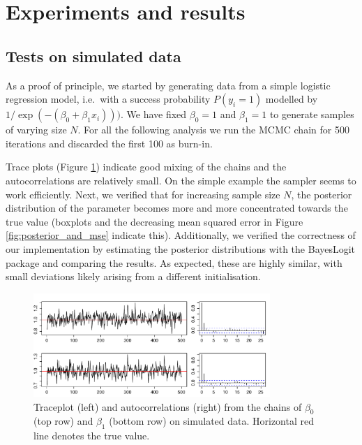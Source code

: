 \documentclass[a4paper]{article}\usepackage[]{graphicx}\usepackage[]{color}
\begin{document}
\section{Experiments and results}

\subsection{Tests on simulated data}

As a proof of principle, we started by generating data from a simple logistic regression model, i.e.~with a success probability $P(y_i=1)$ modelled by $1/\exp(-(\beta_0 + \beta_1 x_i)))$. We have fixed $\beta_0 = 1$ and $\beta_1 = 1$ to generate samples of varying size $N$. For all the following analysis we run the MCMC chain for 500 iterations and discarded the first 100 as burn-in.

Trace plots (Figure \ref{fig:traceplot}) indicate good mixing of the chains and the autocorrelations are relatively small. On the simple example the sampler seems to work efficiently.
Next, we verified that for increasing sample size $N$, the posterior distribution of the parameter becomes more and more concentrated towards the true value (boxplots and the decreasing mean squared error in Figure \ref{fig:posterior_and_mse} indicate this). Additionally, we verified the correctness of our implementation by estimating the posterior distributions with the BayesLogit package and comparing the results. As expected, these are highly similar, with small deviations likely arising from a different initialisation.

\begin{figure}[ht]
\centering
\includegraphics[width=0.8\textwidth]{fig_traceplot_beta}
\caption{Traceplot (left) and autocorrelations (right) from the chains of $\beta_0$ (top row) and $\beta_1$ (bottom row) on simulated data. Horizontal red line denotes the true value. }
\label{fig:traceplot}
\end{figure}
\end{document}

